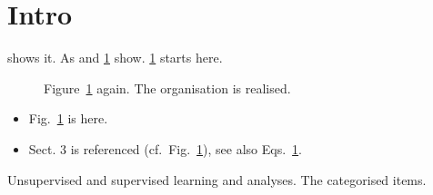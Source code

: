 \documentclass{llncs}
\begin{document}
\section{Intro}
 shows it. As  and \cref{fig:a} show.
\cref{fig:a} starts here.
\begin{figure}\caption{Figure~\ref{fig:a} again. The organisation is realised.}\label{fig:a}\end{figure}
\begin{itemize}
\item Fig.~\ref{fig:a} is here.
\item[a)] Sect. 3 is referenced (cf.\ Fig.~\ref{fig:a}), see also Eqs.~\ref{fig:a}.
\end{itemize}
Unsupervised and supervised learning and analyses. The categorised items.
\end{document}
